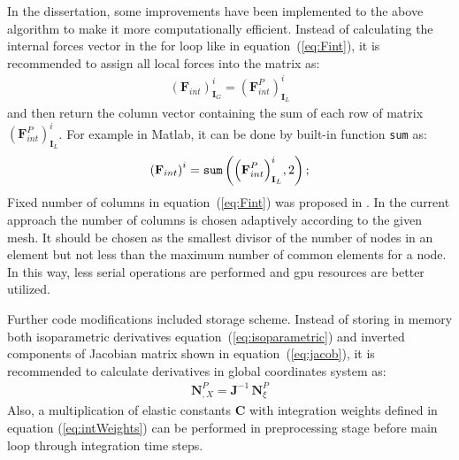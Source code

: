 In the dissertation, some improvements have been implemented to the above algorithm to make it more computationally efficient.
Instead of calculating the internal forces vector in the for loop like in equation~(\ref{eq:Fint}), it is recommended to assign all local forces into the matrix as:
\begin{eqnarray}
	\label{eq:Fmatrix}
	{\left(\textbf{F}_{int}\right)}^i_{\textbf{I}_G} ={\left(\textbf{F}^P_{int}\right)}^i_{\textbf{I}_L}
\end{eqnarray}
and then return the column vector containing the sum of each row of matrix \({\left(\textbf{F}^P_{int}\right)}^i_{\textbf{I}_L}\).
For example in Matlab, it can be done by built-in function \verb|sum| as:
\begin{eqnarray}
	\label{eq:Fsum}
	{\left(\textbf{F}_{int}\right)}^i = \verb|sum| \left({\left(\textbf{F}^P_{int}\right)}^i_{\textbf{I}_L},2\right);
\end{eqnarray}
Fixed number of columns in equation~(\ref{eq:Fint}) was proposed in \cite{kudela2016parallel}. In the current approach the number of columns is chosen adaptively according to the given mesh. It should be chosen as the smallest divisor of the number of nodes in an element but not less than the maximum number of common elements for a node. In this way, less serial operations are performed and \ac{gpu} resources are better utilized.

Further code modifications included storage scheme. Instead of storing in memory both isoparametric derivatives equation~(\ref{eq:isoparametric}) and inverted components of Jacobian matrix shown in equation~(\ref{eq:jacob}), it is recommended to calculate derivatives in global coordinates system as:
\begin{eqnarray}
	\textbf{N}^P_{,X} = \textbf{J}^{-1}\,\textbf{N}^P_{\xi} 
\end{eqnarray}
Also, a multiplication of elastic constants \(\textbf{C}\) with integration weights defined in equation (\ref{eq:intWeights}) can be performed in preprocessing stage before main loop through integration time steps.
